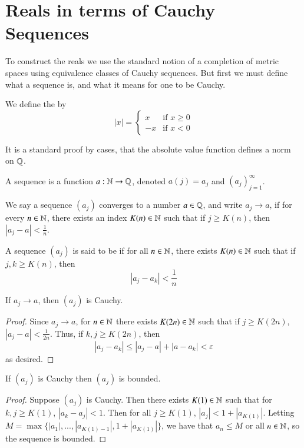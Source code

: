 \section{Reals in terms of Cauchy Sequences}

To construct the reals we use the standard notion of a completion of metric spaces using equivalence classes of Cauchy sequences. But first we must define what a sequence is, and what it means for one to be Cauchy.

\begin{defn}
    We define the  by $$|x| = \left\{\begin{array}{cc} x & \text{if }x \geq 0 \\ -x & \text{if } x < 0\end{array}\right.$$
\end{defn}

It is a standard proof by cases, that the absolute value function defines a norm on $\mathbb Q$.

\begin{defn}
    A sequence is a function $a:\mathbb N\rightarrow \mathbb Q$, denoted $a(j) = a_j$ and $(a_j)_{j=1}^{\infty}$.
\end{defn}

\begin{defn}
    We say a sequence $(a_j)$ converges to a number $a \in \mathbb Q$, and write $a_j\rightarrow a$, if for every $n \in \mathbb N$, there exists an index $K(n) \in \mathbb N$ such that if $j\geq K(n)$, then $|a_j - a| < \frac{1}{n}$.
\end{defn}

\begin{defn}
    A sequence $(a_j)$ is said to be  if for all $n \in \mathbb N$, there exists $K(n) \in \mathbb N$ such that if $j,k \geq K(n)$, then $$|a_j - a_k| < \frac{1}{n}$$
\end{defn}

\begin{prop}
    If $a_j\rightarrow a$, then $(a_j)$ is Cauchy.
\end{prop}
\begin{proof}
    Since $a_j \rightarrow a$, for $n \in \mathbb N$ there exists $K(2n) \in \mathbb N$ such that if $j \geq K(2n)$, $|a_j - a| < \frac{1}{2n}$. Thus, if $k,j \geq K(2n)$, then $$|a_j - a_k| \leq |a_j - a| + |a - a_k| < \varepsilon$$ as desired.
\end{proof}

\begin{prop}
    If $(a_j)$ is Cauchy then $(a_j)$ is bounded.
\end{prop}
\begin{proof}
    Suppose $(a_j)$ is Cauchy. Then there exists $K(1) \in \mathbb N$ such that for $k,j\geq K(1)$, $|a_k - a_j| < 1$. Then for all $j \geq K(1)$, $|a_j| < 1 + |a_{K(1)}|$. Letting $M = \max\{|a_1|,...,|a_{K(1)-1}|, 1+|a_{K(1)}|\}$, we have that $a_n \leq M$ or all $n \in \mathbb N$, so the sequence is bounded.
\end{proof}

